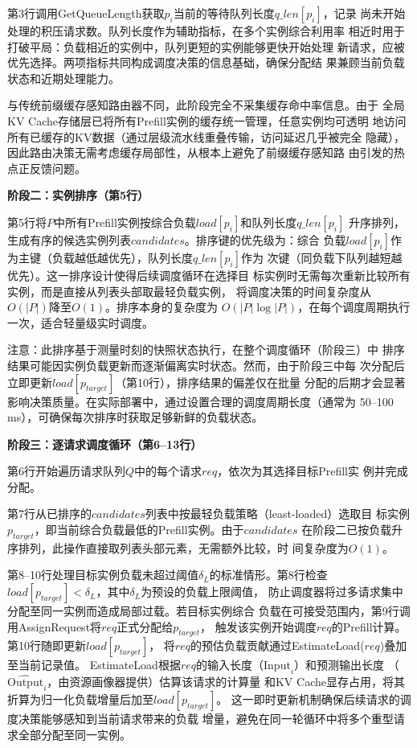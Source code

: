 \begin{enumerate}
第3行调用GetQueueLength获取$p_i$当前的等待队列长度$q\_len[p_i]$，记录
尚未开始处理的积压请求数。队列长度作为辅助指标，在多个实例综合利用率
相近时用于打破平局：负载相近的实例中，队列更短的实例能够更快开始处理
新请求，应被优先选择。两项指标共同构成调度决策的信息基础，确保分配结
果兼顾当前负载状态和近期处理能力。

与传统前缀缓存感知路由器不同，此阶段完全不采集缓存命中率信息。由于
全局KV Cache存储层已将所有Prefill实例的缓存统一管理，任意实例均可透明
地访问所有已缓存的KV数据（通过层级流水线重叠传输，访问延迟几乎被完全
隐藏），因此路由决策无需考虑缓存局部性，从根本上避免了前缀缓存感知路
由引发的热点正反馈问题。

\textbf{阶段二：实例排序（第5行）}

第5行将$P$中所有Prefill实例按综合负载$load[p_i]$和队列长度$q\_len[p_i]$
升序排列，生成有序的候选实例列表$candidates$。排序键的优先级为：综合
负载$load[p_i]$作为主键（负载越低越优先），队列长度$q\_len[p_i]$作为
次键（同负载下队列越短越优先）。这一排序设计使得后续调度循环在选择目
标实例时无需每次重新比较所有实例，而是直接从列表头部取最轻负载实例，
将调度决策的时间复杂度从$O(|P|)$降至$O(1)$。排序本身的复杂度为
$O(|P| \log |P|)$，在每个调度周期执行一次，适合轻量级实时调度。

注意：此排序基于测量时刻的快照状态执行，在整个调度循环（阶段三）中
排序结果可能因实例负载更新而逐渐偏离实时状态。然而，由于阶段三中每
次分配后立即更新$load[p_{target}]$（第10行），排序结果的偏差仅在批量
分配的后期才会显著影响决策质量。在实际部署中，通过设置合理的调度周期长度（通常为
50--100 ms），可确保每次排序时获取足够新鲜的负载状态。

\textbf{阶段三：逐请求调度循环（第6--13行）}

第6行开始遍历请求队列$Q$中的每个请求$req$，依次为其选择目标Prefill实
例并完成分配。

第7行从已排序的$candidates$列表中按最轻负载策略（least-loaded）选取目
标实例$p_{target}$，即当前综合负载最低的Prefill实例。由于$candidates$
在阶段二已按负载升序排列，此操作直接取列表头部元素，无需额外比较，时
间复杂度为$O(1)$。

第8--10行处理目标实例负载未超过阈值$\delta_L$的标准情形。第8行检查
$load[p_{target}] < \delta_L$，其中$\delta_L$为预设的负载上限阈值，
防止调度器将过多请求集中分配至同一实例而造成局部过载。若目标实例综合
负载在可接受范围内，第9行调用AssignRequest将$req$正式分配给$p_{target}$，
触发该实例开始调度$req$的Prefill计算。第10行随即更新$load[p_{target}]$，
将$req$的预估负载贡献通过EstimateLoad($req$)叠加至当前记录值。
EstimateLoad根据$req$的输入长度（$\text{Input}_i$）和预测输出长度
（$\widehat{\text{Output}}_i$，由资源画像器提供）估算该请求的计算量
和KV Cache显存占用，将其折算为归一化负载增量后加至$load[p_{target}]$。
这一即时更新机制确保后续请求的调度决策能够感知到当前请求带来的负载
增量，避免在同一轮循环中将多个重型请求全部分配至同一实例。


\end{enumerate}

